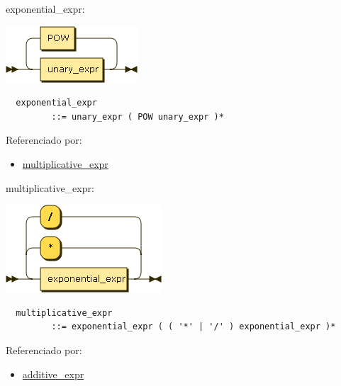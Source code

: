 \begin{minipage}{\textwidth}
  \protect\hypertarget{exponential_expr}{}{exponential\_expr:}

  \includegraphics[width=1.93750in,height=0.83333in]{diagram/exponential_expr.png}

  \begin{verbatim}
  exponential_expr
         ::= unary_expr ( POW unary_expr )*
  \end{verbatim}

  Referenciado por:

  \begin{itemize}
      \tightlist%
    \item
      \protect\hyperlink{multiplicative_expr}{multiplicative\_expr}
  \end{itemize}

\end{minipage}

\begin{minipage}{\textwidth}
  \protect\hypertarget{multiplicative_expr}{}{multiplicative\_expr:}

  \includegraphics[width=2.29167in,height=1.29167in]{diagram/multiplicative_expr.png}

  \begin{verbatim}
  multiplicative_expr
         ::= exponential_expr ( ( '*' | '/' ) exponential_expr )*
  \end{verbatim}

  Referenciado por:

  \begin{itemize}
      \tightlist%
    \item
      \protect\hyperlink{additive_expr}{additive\_expr}
  \end{itemize}

\end{minipage}

